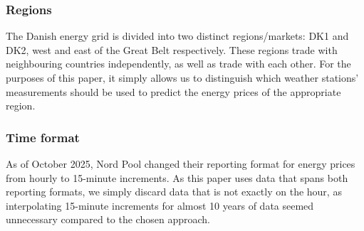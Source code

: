 \subsubsection{Regions}
The Danish energy grid is divided into two distinct regions/markets: DK1 and 
DK2, west and east of the Great Belt respectively. These regions trade with 
neighbouring countries independently, as well as trade with each other. For the 
purposes of this paper, it simply allows us to distinguish which weather 
stations' measurements should be used to predict the energy prices of the 
appropriate region.
\subsubsection{Time format}
As of October 2025, Nord Pool changed their reporting format for energy 
prices from hourly to 15-minute increments. As this paper uses data that spans 
both reporting formats, we simply discard data that is not exactly on the hour, 
as interpolating 15-minute increments for almost 10 years of data seemed 
unnecessary compared to the chosen approach. 